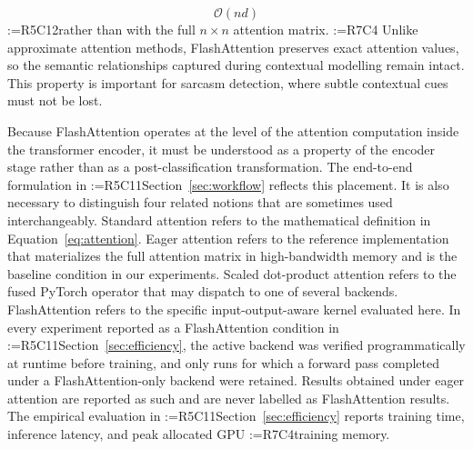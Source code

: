 \documentclass[a4paper,fleqn]{cas-sc}
\makeatletter
\newif\iftracked
\newcommand{\rv@setcolour}[1]{%
  \IfStrEq{#1}{R7C7}{\color{rvEdit}}{%
    \IfSubStr{#1}{R5}{\IfSubStr{#1}{R7}{\color{rvBoth}}{\color{rvFive}}}{\color{rvSeven}}}}
\newcommand{\rv@tag}[1]{\textsuperscript{\sffamily\bfseries\scriptsize[\StrSubstitute{#1}{,}{, }]}\,}
\newcommand{\rv@recordone}[1]{%
  \edef\rv@i{#1}%
  \ifcsdef{rv@n@\rv@i}{}{\csgdef{rv@n@\rv@i}{0}}%
  \csxdef{rv@n@\rv@i}{\the\numexpr\csuse{rv@n@\rv@i}+1\relax}%
  \begingroup\edef\@currentlabel{\rv@i}\label{rv:\rv@i:\csuse{rv@n@\rv@i}}\endgroup}
\newcommand{\rv@record}[1]{\@for\rv@id:=#1\do{\expandafter\rv@recordone\expandafter{\rv@id}}}
\DeclareRobustCommand{\rc}[2]{\rv@record{#1}\iftracked{\rv@setcolour{#1}\rv@tag{#1}#2}\else#2\fi}
\DeclareRobustCommand{\rcdel}[2]{\rv@record{#1}\iftracked{\rv@setcolour{#1}\rv@tag{#1}\rv@strike{#2}}\else\unskip\fi}
\DeclareRobustCommand{\rcrep}[3]{\rv@record{#1}\iftracked{\rv@setcolour{#1}\rv@tag{#1}\rv@strike{#2} #3}\else#3\fi}
\makeatother
\begin{document}
\begin{equation}
\mathcal{O}(nd)
\label{eq:fa-memory}
\end{equation}
\rc{R5C12}{rather than with the full $n \times n$ attention matrix.} \rcdel{R7C4}{This leads to significant improvements in GPU utilization and training speed.} Unlike approximate attention methods, FlashAttention preserves exact attention values, so the semantic relationships captured during contextual modelling remain intact. This property is important for sarcasm detection, where subtle contextual cues must not be lost.

Because FlashAttention operates at the level of the attention computation inside the transformer encoder, it must be understood as a property of the encoder stage rather than as a post-classification transformation. The end-to-end formulation in \rcrep{R5C11}{Section 3.8}{Section~\ref{sec:workflow}} reflects this placement. It is also necessary to distinguish four related notions that are sometimes used interchangeably. Standard attention refers to the mathematical definition in Equation~\eqref{eq:attention}. Eager attention refers to the reference implementation that materializes the full attention matrix in high-bandwidth memory and is the baseline condition in our experiments. Scaled dot-product attention refers to the fused PyTorch operator that may dispatch to one of several backends. FlashAttention refers to the specific input-output-aware kernel evaluated here. In every experiment reported as a FlashAttention condition in \rcrep{R5C11}{Section 6.1}{Section~\ref{sec:efficiency}}, the active backend was verified programmatically at runtime before training, and only runs for which a forward pass completed under a FlashAttention-only backend were retained. Results obtained under eager attention are reported as such and are never labelled as FlashAttention results. The empirical evaluation in \rcrep{R5C11}{Section 6.1}{Section~\ref{sec:efficiency}} reports training time, inference latency, and peak allocated GPU \rcrep{R7C4}{memory for both training and inference}{training memory}.
\end{document}
